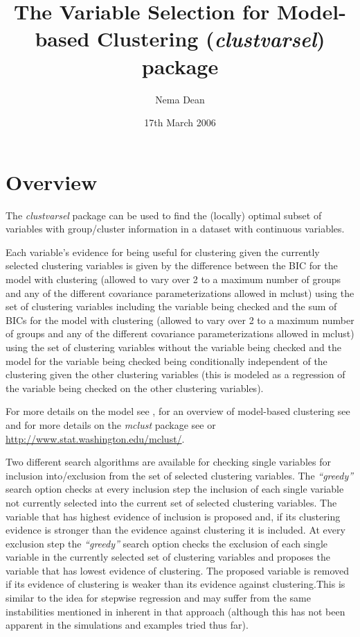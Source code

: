 \documentclass[,12pt]{article}
\newcommand{\Rpackage}[1]{{\textit{#1}}}
\newcommand{\Rfunarg}[1]{{\textit{#1}}}
\begin{document}
\title{The Variable Selection for Model-based Clustering (\Rpackage{clustvarsel}) package}
\author{Nema Dean}
\date{17th March 2006}
\maketitle
\tableofcontents

\section{Overview} 

The \Rpackage{clustvarsel} package can be used to find the (locally) optimal subset of variables with group/cluster information in a dataset with continuous variables. 

Each variable's evidence for being useful for clustering given the currently selected clustering variables is given by the difference between the BIC for the model with clustering (allowed to vary over 2 to a maximum number of groups and any of the different covariance parameterizations allowed in mclust) using the set of clustering variables including the variable being checked and the sum of BICs for the model with clustering (allowed to vary over 2 to a maximum number of groups and any of the different covariance parameterizations allowed in mclust) using the set of clustering variables without the variable being checked and the model for the variable being checked being conditionally independent of the clustering given the other clustering variables (this is modeled as a regression of the variable being checked on the other clustering variables).  

For more details on the model see , for an overview of model-based clustering see  and for more details on the \Rpackage{mclust} package see  or \url{http://www.stat.washington.edu/mclust/}.

Two different search algorithms are available for checking single variables for inclusion into/exclusion from the set of selected clustering variables. The \Rfunarg{``greedy''} search option checks at every inclusion step the inclusion of each single variable not currently selected into the current set of selected clustering variables. The variable that has highest evidence of inclusion is proposed and, if its clustering evidence is stronger than the evidence against clustering it is included. At every exclusion step  the \Rfunarg{``greedy''} search option checks the exclusion of each single variable in the currently selected set of clustering variables and proposes the variable that has lowest evidence of clustering. The proposed variable is removed if its evidence of clustering is weaker than its evidence against clustering.This is similar to the idea for stepwise regression and may suffer from the same instabilities mentioned in  inherent in that approach (although this has not been apparent in the simulations and examples tried thus far).
\end{document}
